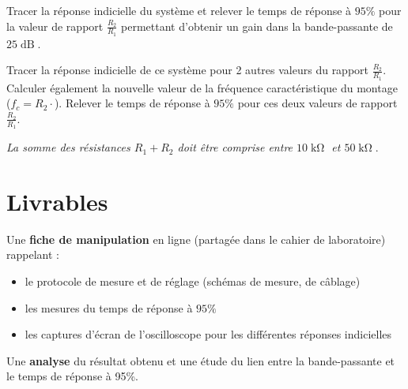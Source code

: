 \Manip Tracer la réponse indicielle du système et relever le temps de réponse à $95\%$ pour la valeur de rapport $\frac{R_2}{R_1}$ permettant d'obtenir un gain dans la bande-passante de $25\operatorname{dB}$.

\Manip Tracer la réponse indicielle de ce système pour 2 autres valeurs du rapport $\frac{R_2}{R_1}$. Calculer également la nouvelle valeur de la fréquence caractéristique du montage ($f_c = R_2 \cdot $). Relever le temps de réponse à $95\%$ pour ces deux valeurs de rapport $\frac{R_2}{R_1}$.

\medskip

\textit{La somme des résistances $R_1 + R_2$ doit être comprise entre $10\operatorname{k\Omega}$ et $50\operatorname{k\Omega}$}.

\section{Livrables}


Une \textbf{fiche de manipulation} en ligne (partagée dans le cahier de laboratoire) rappelant :

\begin{itemize}
	\item le protocole de mesure et de réglage (schémas de mesure, de câblage)
	\item les mesures du temps de réponse à $95\%$
	\item les captures d'écran de l'oscilloscope pour les différentes réponses indicielles
\end{itemize}

Une \textbf{analyse} du résultat obtenu et une étude du lien entre la bande-passante et le temps de réponse à 95\%.

